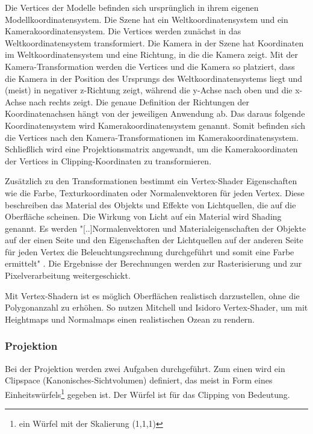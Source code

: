 Die Vertices der Modelle befinden sich ursprünglich in ihrem eigenen Modellkoordinatensystem. Die Szene hat ein Weltkoordinatensystem und ein Kamerakoordinatensystem. Die Vertices werden zunächst in das Weltkoordinatensystem transformiert. Die Kamera in der Szene hat Koordinaten im Weltkoordinatensystem und eine Richtung, in die die Kamera zeigt. Mit der Kamera-Transformation werden die Vertices und die Kamera so platziert, dass die Kamera in der Position des Ursprungs des Weltkoordinatensystems liegt und (meist) in negativer z-Richtung zeigt, während die y-Achse nach oben und die x-Achse nach rechts zeigt. Die genaue Definition der Richtungen der Koordinatenachsen hängt von der jeweiligen Anwendung ab. Das daraus folgende Koordinatensystem wird Kamerakoordinatensystem genannt. Somit befinden sich die Vertices nach den Kamera-Transformationen im Kamerakoordinatensystem. Schließlich wird eine Projektionsmatrix angewandt, um die Kamerakoordinaten der Vertices in Clipping-Koordinaten zu transformieren.

Zusätzlich zu den Transformationen bestimmt ein Vertex-Shader Eigenschaften wie die Farbe, Texturkoordinaten oder Normalenvektoren für jeden Vertex. Diese beschreiben das Material des Objekts und Effekte von Lichtquellen, die auf die Oberfläche scheinen. Die Wirkung von Licht auf ein Material wird Shading genannt. Es werden "[..]Normalenvektoren und Materialeigenschaften der Objekte auf der einen Seite und den Eigenschaften der Lichtquellen auf der anderen Seite für jeden Vertex die Beleuchtungsrechnung durchgeführt und somit eine Farbe ermittelt" \cite*[Nischwitz (2012) S.48,][]{nischwitz2012}. Die Ergebnisse der Berechnungen werden zur Rasterisierung und zur Pixelverarbeitung weitergeschickt\cite*[Moeller (2019)]{moeller2019}.

Mit Vertex-Shadern ist es möglich Oberflächen realistisch darzustellen, ohne die Polygonanzahl zu erhöhen. So nutzen Mitchell\cite*[][]{mitchell2005} und Isidoro \cite*[][]{isidoro2002} Vertex-Shader, um mit Heightmaps %
und Normalmaps %
einen realistischen Ozean zu rendern.

\subsubsection{Projektion}
\label{grp-geometrieverarbeitung-projektion}
Bei der Projektion werden zwei Aufgaben durchgeführt. Zum einen wird ein Clipspace (Kanonisches-Sichtvolumen) definiert, das meist in Form eines Einheitswürfels\footnote{ein Würfel mit der Skalierung (1,1,1)} gegeben ist. Der Würfel ist für das Clipping von Bedeutung.

